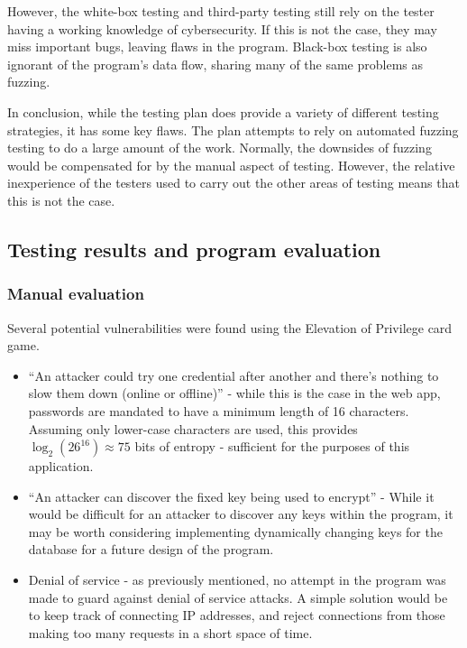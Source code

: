 However, the white-box testing and third-party testing still rely on the tester having a working knowledge of cybersecurity. If this is not the case, they may miss important bugs, leaving flaws in the program. Black-box testing is also ignorant of the program's data flow, sharing many of the same problems as fuzzing.

In conclusion, while the testing plan does provide a variety of different testing strategies, it has some key flaws. The plan attempts to rely on automated fuzzing testing to do a large amount of the work. Normally, the downsides of fuzzing would be compensated for by the manual aspect of testing. However, the relative inexperience of the testers used to carry out the other areas of testing means that this is not the case.

\subsection{Testing results and program evaluation}

\subsubsection{Manual evaluation}

Several potential vulnerabilities were found using the Elevation of Privilege card game.

\begin{itemize}

    \item ``An attacker could try one credential after another and there's nothing to slow them down (online or offline)'' - while this is the case in the web app, passwords are mandated to have a minimum length of 16 characters. Assuming only lower-case characters are used, this provides $ \log_2 ({26}^{16}) \approx 75 $ bits of entropy - sufficient for the purposes of this application.

    \item ``An attacker can discover the fixed key being used to encrypt'' - While it would be difficult for an attacker to discover any keys within the program, it may be worth considering implementing dynamically changing keys for the database for a future design of the program.

    \item Denial of service - as previously mentioned, no attempt in the program was made to guard against denial of service attacks. A simple solution would be to keep track of connecting IP addresses, and reject connections from those making too many requests in a short space of time.

\end{itemize}

